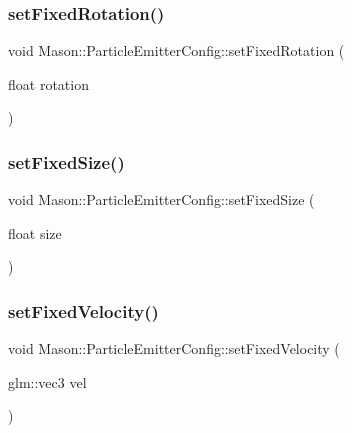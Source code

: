 \hypertarget{struct_mason_1_1_particle_emitter_config_acb790846d2a00fd97160fdac66589fd5}{}\label{struct_mason_1_1_particle_emitter_config_acb790846d2a00fd97160fdac66589fd5} 
\subsubsection{\texorpdfstring{set\+Fixed\+Rotation()}{setFixedRotation()}}
{\footnotesize\ttfamily void Mason\+::\+Particle\+Emitter\+Config\+::set\+Fixed\+Rotation (\begin{DoxyParamCaption}\item[{float}]{rotation }\end{DoxyParamCaption})\hspace{0.3cm}{\ttfamily [inline]}}

\hypertarget{struct_mason_1_1_particle_emitter_config_a52313455114fadb6609232719681b4d7}{}\label{struct_mason_1_1_particle_emitter_config_a52313455114fadb6609232719681b4d7} 
\subsubsection{\texorpdfstring{set\+Fixed\+Size()}{setFixedSize()}}
{\footnotesize\ttfamily void Mason\+::\+Particle\+Emitter\+Config\+::set\+Fixed\+Size (\begin{DoxyParamCaption}\item[{float}]{size }\end{DoxyParamCaption})\hspace{0.3cm}{\ttfamily [inline]}}

\hypertarget{struct_mason_1_1_particle_emitter_config_a63a5b2c01c1f4cc0eaa1e8d4b9226146}{}\label{struct_mason_1_1_particle_emitter_config_a63a5b2c01c1f4cc0eaa1e8d4b9226146} 
\subsubsection{\texorpdfstring{set\+Fixed\+Velocity()}{setFixedVelocity()}}
{\footnotesize\ttfamily void Mason\+::\+Particle\+Emitter\+Config\+::set\+Fixed\+Velocity (\begin{DoxyParamCaption}\item[{glm\+::vec3}]{vel }\end{DoxyParamCaption})\hspace{0.3cm}{\ttfamily [inline]}}

